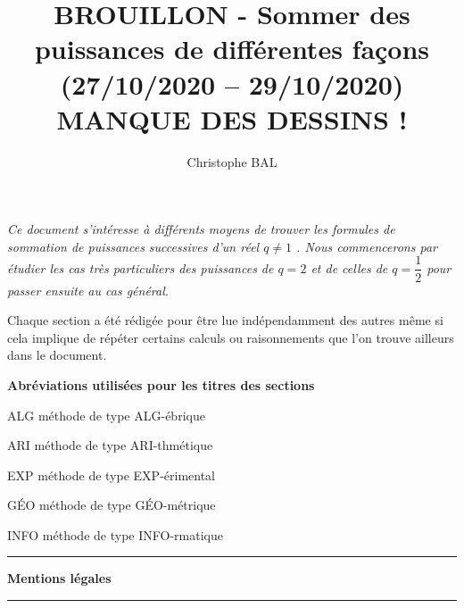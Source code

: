 \documentclass[12pt]{amsbook}
\newcommand\methodo[2]{méthode de type \uppercase{#1}-#2}
\begin{document}
\title{BROUILLON - Sommer des puissances de différentes façons \\{\small(27/10/2020 -- 29/10/2020)} \\ MANQUE DES DESSINS !}

\author{Christophe BAL}

\maketitle



\begin{tcolorbox}
	\small\itshape
	Ce document s'intéresse à différents moyens de trouver les formules de sommation de puissances successives d'un réel $q \neq 1$ .
	Nous commencerons par étudier les cas très particuliers des puis\-sances de $q = 2$ et de celles de $q = \dfrac12$ pour passer ensuite au cas général.
	
	\medskip
	
	Chaque section a été rédigée pour être lue indépendamment des autres même si cela implique de répéter certains calculs ou raisonnements que l'on trouve ailleurs dans le document.
	
	\bigskip
	
	\begin{center}
		\textbf{Abréviations utilisées pour les titres des sections} 
	\end{center}
	
	\smallskip
	
	\begin{methods}
		\item[ALG]
		      \methodo{alg}{ébrique}

		\item[ARI]
		      \methodo{ari}{thmétique}

		\item[EXP]
		      \methodo{exp}{érimental}

		\item[GÉO]
		      \methodo{géo}{métrique}

		\item[INFO]
		      \methodo{info}{rmatique}
	\end{methods}
\end{tcolorbox}


\bigskip
\bigskip
\bigskip


\begin{center}
	\hrule\vspace{.3em}
	{
		\fontsize{1.35em}{1em}\selectfont
		\textbf{Mentions \og légales \fg}
	}
			
	\vspace{0.45em}
	\doclicenseThis
	\hrule
\end{center}
\end{document}
